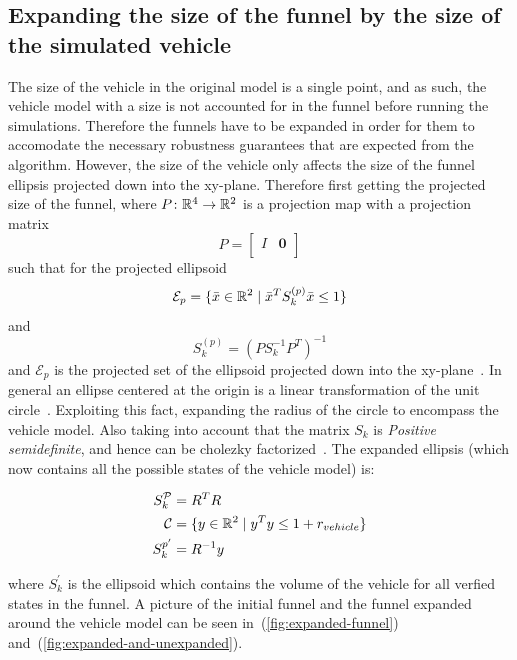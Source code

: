 \subsection{Expanding the size of the funnel by the size of the simulated
  vehicle}

The size of the vehicle in the original model is a single point, and as such,
the vehicle model with a size is not accounted for in the funnel before running
the simulations. Therefore the funnels have to be expanded in order for them to
accomodate the necessary robustness guarantees that are expected from the
algorithm. However, the size of the vehicle only affects the size of the funnel
ellipsis projected down into the xy-plane. Therefore first getting the projected
size of the funnel, where \(P \colon \mathbb{R}^4 \rightarrow \mathbb{R}^2\) is a projection map
with a projection matrix
\[
  P =
  \begin{bmatrix}
    I & \mathbf{0} \\
  \end{bmatrix}
\]
such that for the projected ellipsoid
\[
  \mathcal{E}_{p} = \lbrace\bar{x} \in \mathbb{R}^{2} \mid {\bar{x}}^{T}S_{k}^{(p)}\bar{x}
    \leq 1\rbrace
\]
and
\[
  S_{k}^{(p)} = \left( PS_{k}^{-1}P^T \right)^{-1}
\]
and \(\mathcal{E}_{p}\) is the projected set of the ellipsoid projected down
into the xy-plane~\cite{majumdarFunnelLibrariesRealtime2017}. In general an
ellipse centered at the origin is a linear transformation of the unit
circle~\cite{lay2005linear}. Exploiting this fact, expanding the radius of the
circle to encompass the vehicle model. Also taking into account that the matrix
\(S_{k}\) is \textit{Positive semidefinite}, and hence can be cholezky
factorized~\cite{lay2005linear}. The expanded ellipsis (which now contains all
the possible states of the vehicle model) is:

\begin{align*}
  S_{k}^{\mathcal{P}} &= R^{T}R \\
  \mathcal{C} &= \lbrace y \in \mathbb{R}^2 \mid y^{T}y \leq 1 + r_{vehicle}\rbrace \\
  S_{k}^{p'} &= R^{-1}y \\
\end{align*}

where \(S_{k}^{'}\) is the ellipsoid which contains the volume of the vehicle
for all verfied states in the funnel. A picture of the initial funnel and the
funnel expanded around the vehicle model can be seen
in~(\ref{fig:expanded-funnel}) and~(\ref{fig:expanded-and-unexpanded}).


